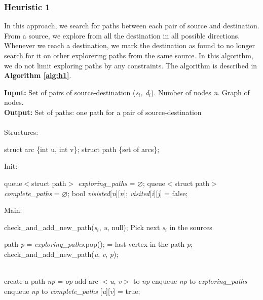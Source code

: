 \subsubsection{Heuristic 1}
In this approach, we search for paths between each pair of source and destination. From a source, we explore from all the destination in all possible directions. Whenever we reach a destination, we mark the destination as found to no longer search for it on other explorering paths from the same source. In this algorithm, we do not limit exploring paths by any constraints. The algorithm is described in \textbf{Algorithm \ref{alg:h1}}.

\begin{algorithm}[!htp]
\textbf{Input:} Set of pairs of source-destination (\textit{s$_i$, d$_i$}). Number of nodes \textit{n}. Graph of nodes. \\
\textbf{Output:} Set of paths: one path for a pair of source-destination \\
\\
Structures:
\begin{algorithmic}
\State struct arc \{int u, int v\};
\State struct path \{set of arcs\};
\end{algorithmic}
Init:
    \begin{algorithmic}
	\State queue$<$struct path$>$ \textit{exploring\_paths} = $\varnothing$;
	\State queue$<$struct path$>$ \textit{complete\_paths} = $\varnothing$;
	\State bool \textit{visisted}[\textit{n}][\textit{n}];
	    \State \textit{visited}[{\it i}][{\it j}] = false;
	\EndFor
    \end{algorithmic}
Main:

\begin{algorithmic}

	\State check\_and\_add\_new\_path({\it s}$_i$, \textit{u}, null);
	\State Pick next \textit{s$_i$} in the sources
    \EndWhile

	\State path \textit{p} = \textit{exploring\_paths}.pop();
	 = last vertex in the path {\it p};
	    \State check\_and\_add\_new\_path({\it u}, \textit{v}, {\it p});
	\EndFor
    \EndWhile

    \EndFunction
\\
	    \State create a path \textit{np} = {\it op}
	    \State add arc $<$\textit{u}, \textit{v}$>$ to \textit{np}
	    \State enqueue \textit{np} to \textit{exploring\_paths}
	        \State enqueue \textit{np} to \textit{complete\_paths}
            \EndIf
	    [\textit{u}][\textit{v}] = true;
	\EndIf
    \EndFunction
\end{algorithmic}


\end{algorithm}
